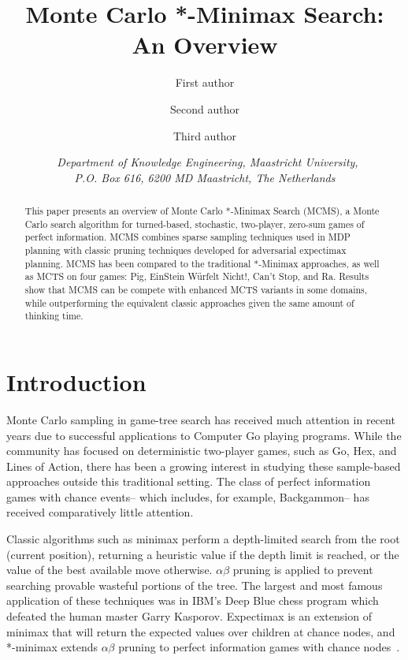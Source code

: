 \documentclass{article}
\title{\textbf{\huge Monte Carlo *-Minimax Search: An Overview}}
\author{First author \affila \and
    Second author \affila \and
    Third author \affila}
\date{\affila\ \textit{Department of Knowledge Engineering, Maastricht University,\\ P.O. Box 616, 6200 MD Maastricht, The Netherlands}}
\begin{document}
\ttl
\thispagestyle{empty}



\begin{abstract}
\noindent   This paper presents an overview of Monte Carlo *-Minimax Search (MCMS), a Monte Carlo search algorithm for 
  turned-based, stochastic, two-player, zero-sum games of perfect information.
  MCMS combines sparse sampling techniques used in MDP planning with classic pruning techniques developed 
  for adversarial expectimax planning.
  MCMS has been compared to the traditional *-Minimax approaches, as well as MCTS  
  on four games: Pig, EinStein W\"{u}rfelt Nicht!, Can't Stop, and Ra.
  Results show that MCMS can be compete with enhanced MCTS variants in some domains, 
  while outperforming the equivalent classic approaches given the same amount of thinking time. 
\end{abstract}

\section{Introduction}

Monte Carlo sampling in game-tree search has received much attention in recent years due to successful applications to 
Computer Go playing programs. 
While the community has focused on deterministic two-player games, such as Go, Hex, and Lines of Action, there
has been a growing interest in studying these sample-based approaches outside this traditional setting. The class of 
perfect information games with chance events-- which includes, for example, Backgammon-- has received comparatively 
little attention. 

Classic algorithms such as minimax perform a depth-limited search from the root (current position), 
returning a heuristic value if the depth limit is reached, or the value of the best available move otherwise.  
$\alpha \beta$ pruning is applied to prevent searching provable wasteful portions of the tree. The largest 
and most famous application of these techniques was in IBM's Deep Blue chess program which defeated the human master 
Garry Kasporov. Expectimax is an extension of minimax that will return the expected values over children at 
chance nodes, and *-minimax extends $\alpha \beta$ pruning to perfect information games with 
chance nodes~\cite{Ballard83}. 
\end{document}
